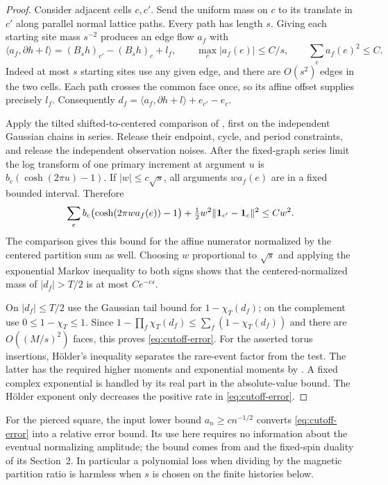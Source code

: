 \begin{proof}
Consider adjacent cells $c,c'$.  Send the uniform mass on $c$ to its
translate in $c'$ along parallel normal lattice paths.  Every path has
length $s$.  Giving each starting site mass $s^{-2}$ produces an edge
flow $a_f$ with
\begin{equation}\label{prep:two-cell-flow}
 \langle a_f,\partial h+l\rangle
       =(B_sh)_{c'}-(B_sh)_c+l_f,
 \qquad \max_e|a_f(e)|\le C/s,
 \qquad \sum_e a_f(e)^2\le C.
\end{equation}
Indeed at most $s$ starting sites use any given edge, and there are
$O(s^2)$ edges in the two cells.  Each path crosses the common face
once, so its affine offset supplies precisely $l_f$.  Consequently
$d_f=\langle a_f,\partial h+l\rangle+e_{c'}-e_c$.

Apply the tilted shifted-to-centered comparison of
\cite[Lemma 2.2]{X}, first on the independent
Gaussian chains in series.  Release their endpoint, cycle, and period
constraints, and release the independent observation noises.  After the
fixed-graph series limit the log transform of one primary increment at
argument $u$ is $b_c(\cosh(2\pi u)-1)$.  If $|w|\le c\sqrt{s}$, all
arguments $wa_f(e)$ are in a fixed bounded interval.  Therefore
\[
 \sum_e b_c\bigl(\cosh(2\pi wa_f(e))-1\bigr)
       +\tfrac12w^2\lVert\mathbf 1_{c'}-\mathbf 1_c\rVert^2
       \le Cw^2.
\]
The comparison gives this bound for the affine numerator normalized by
the centered partition sum as well.  Choosing $w$ proportional to
$\sqrt{s}$ and applying the exponential Markov inequality to both signs
shows that the centered-normalized mass of $|d_f|>T/2$ is at most
$Ce^{-cs}$.

On $|d_f|\le T/2$ use the Gaussian tail bound for $1-\chi_T(d_f)$;
on the complement use $0\le1-\chi_T\le1$.  Since
$1-\prod_f\chi_T(d_f)\le\sum_f(1-\chi_T(d_f))$ and there are
$O((M/s)^2)$ faces, this proves \eqref{eq:cutoff-error}.
For the asserted torus insertions, H\"older's inequality separates the
rare-event factor from the test.  The latter has the required higher
moments and exponential moments by
\cite[Lemma 2.3]{X}.  A fixed complex
exponential is handled by its real part in the absolute-value bound.
The H\"older exponent only decreases the positive rate in
\eqref{eq:cutoff-error}.
\end{proof}

For the pierced square, the input lower bound
$a_n\ge c n^{-1/2}$ converts \eqref{eq:cutoff-error} into a relative
error bound.  Its use here requires no information about the eventual
normalizing amplitude; the bound comes from
\cite[Equations (18)--(19)]{S} and the fixed-spin duality of its
Section~2.  In particular a polynomial loss when dividing by the magnetic
partition ratio is harmless when $s$ is chosen on the finite histories
below.

